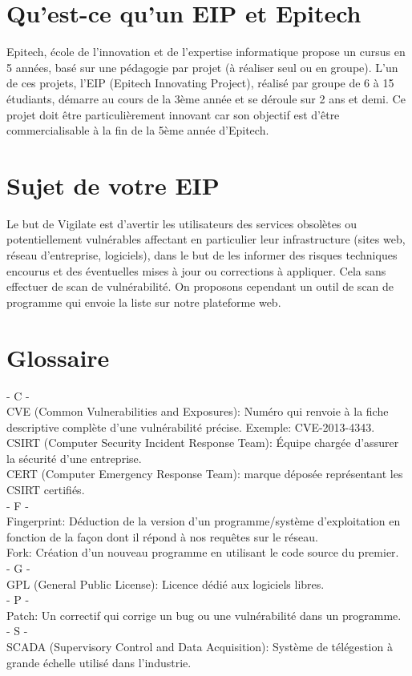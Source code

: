\section{Qu'est-ce qu’un EIP et Epitech}
Epitech,  école de l'innovation et de l'expertise informatique propose un cursus en 5 années, basé sur une pédagogie par projet (à réaliser seul ou en groupe).  L'un de ces projets, l’EIP (Epitech Innovating Project), réalisé par groupe de 6 à 15 étudiants, démarre au cours de la 3ème année et se déroule sur 2 ans et demi. Ce  projet doit être particulièrement innovant car son objectif est d’être commercialisable à la fin de la 5ème année d’Epitech.

\section{Sujet de votre EIP}
Le but de Vigilate est d’avertir les utilisateurs des services obsolètes ou potentiellement vulnérables affectant en particulier leur infrastructure (sites web, réseau d'entreprise, logiciels), dans le but de les informer des risques techniques encourus et des éventuelles mises à jour ou corrections à appliquer.
Cela sans effectuer de scan de vulnérabilité.
On proposons cependant un outil de scan de programme qui envoie la liste sur notre plateforme web.

\section{Glossaire}
\noindent
- C -\\
CVE (Common Vulnerabilities and Exposures): Numéro qui renvoie à la fiche descriptive complète d'une vulnérabilité précise. Exemple: CVE-2013-4343.\\
CSIRT (Computer Security Incident Response Team): Équipe chargée d'assurer la sécurité d'une entreprise.\\
CERT (Computer Emergency Response Team): marque déposée représentant les CSIRT certifiés.\\
- F -\\
Fingerprint: Déduction de la version d'un programme/système d'exploitation en fonction de la façon dont il répond à nos requêtes sur le réseau.\\
Fork: Création d'un nouveau programme en utilisant le code source du premier.\\
- G -\\
GPL (General Public License): Licence dédié aux logiciels libres.\\
- P -\\
Patch: Un correctif qui corrige un bug ou une vulnérabilité dans un programme.\\
- S -\\
SCADA (Supervisory Control and Data Acquisition): Système de télégestion à grande échelle utilisé dans l'industrie.\\

